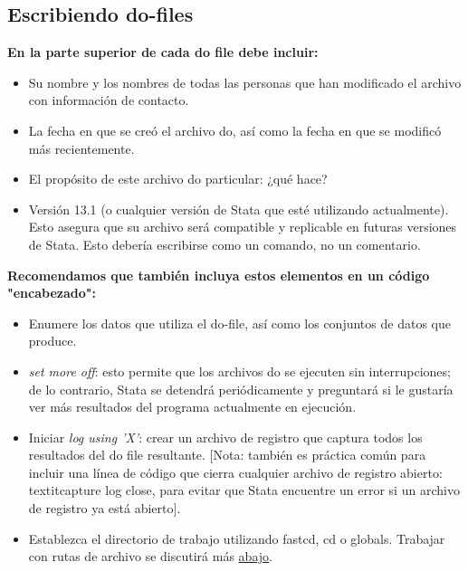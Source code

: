 \documentclass[11pt,en]{elegantpaper}
\begin{document}
\subsection{Escribiendo do-files}
\label{sec:dofiles}

\textbf{En la parte superior de cada do file debe incluir:}

\begin{itemize}
	\item Su nombre y los nombres de todas las personas que han modificado el archivo con información de contacto.
	\item La fecha en que se creó el archivo do, así como la fecha en que se modificó más recientemente.
	\item El propósito de este archivo do particular: ¿qué hace?
	\item Versión 13.1 (o cualquier versión de Stata que esté utilizando actualmente). Esto asegura que su archivo será	                       compatible y replicable en futuras versiones de Stata. Esto debería escribirse como un comando, no un comentario. \end{itemize}

\textbf{Recomendamos que también incluya estos elementos en un código "encabezado":}

\begin{itemize}
	\item Enumere los datos que utiliza el do-file, así como los conjuntos de datos que produce.
	\item \textit{set more off}: esto permite que los archivos do se ejecuten sin interrupciones; de lo contrario, Stata se detendrá               periódicamente y preguntará si le gustaría ver más resultados del programa actualmente en ejecución.
	\item Iniciar \textit{log using 'X'}: crear un archivo de registro que captura todos los resultados del do file resultante.                   [Nota: también es práctica común para incluir una línea de código que cierra cualquier archivo de registro abierto:                     textit{capture log close}, para evitar que Stata encuentre un error si un archivo de registro ya está abierto].
	\item Establezca el directorio de trabajo utilizando fastcd, cd o globals. Trabajar con rutas de archivo se discutirá más
              \hyperref[sec:refrelativas]{abajo}.  
\end{itemize}
\end{document}

